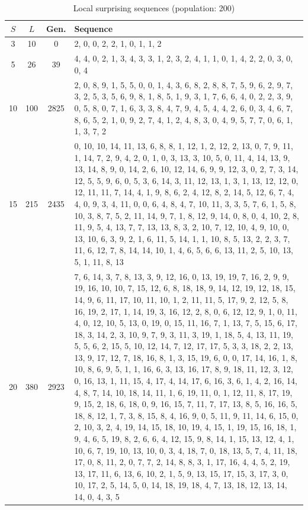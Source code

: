 \begin{table}
{\tiny
\begin{tabularx}{\textwidth}{cccX}
\toprule
$S$ & $L$ & Gen. & Sequence \\
\midrule
3   & 10  & 0   & 2, 0, 0, 2, 2, 1, 0, 1, 1, 2 \\
5   & 26  & 39  & 4, 4, 0, 2, 1, 3, 4, 3, 3, 1, 2, 3, 2, 4, 1, 1, 0, 1, 4, 2, 2, 0, 3, 0, 0, 4 \\
10  & 100 & 2825 & 2, 0, 8, 9, 1, 5, 5, 0, 0, 1, 4, 3, 6, 8, 2, 8, 8, 7, 5, 9, 6, 2, 9, 7, 3, 2, 5, 3, 5, 6, 9, 8, 1, 8, 5, 1, 9, 3, 1, 7, 6, 6, 4, 0, 2, 2, 3, 9, 0, 5, 8, 0, 7, 1, 6, 3, 3, 8, 4, 7, 9, 4, 5, 4, 4, 2, 6, 0, 3, 4, 6, 7, 8, 6, 5, 2, 1, 0, 9, 2, 7, 4, 1, 2, 4, 8, 3, 0, 4, 9, 5, 7, 7, 0, 6, 1, 1, 3, 7, 2 \\
15  & 215 & 2435 & 0, 10, 10, 14, 11, 13, 6, 8, 8, 1, 12, 1, 2, 12, 2, 13, 0, 7, 9, 11, 1, 14, 7, 2, 9, 4, 2, 0, 1, 0, 3, 13, 3, 10, 5, 0, 11, 4, 14, 13, 9, 13, 14, 8, 9, 0, 14, 2, 6, 10, 12, 14, 6, 9, 9, 12, 3, 0, 2, 7, 3, 14, 12, 5, 5, 9, 6, 0, 5, 3, 6, 14, 3, 11, 12, 13, 1, 3, 1, 13, 12, 12, 0, 12, 11, 11, 7, 14, 4, 1, 9, 8, 6, 2, 4, 12, 8, 2, 14, 5, 12, 6, 7, 4, 4, 0, 9, 3, 4, 11, 0, 0, 6, 4, 8, 4, 7, 10, 11, 3, 3, 5, 7, 6, 1, 5, 8, 10, 3, 8, 7, 5, 2, 11, 14, 9, 7, 1, 8, 12, 9, 14, 0, 8, 0, 4, 10, 2, 8, 11, 9, 5, 4, 13, 7, 7, 13, 13, 8, 3, 2, 10, 7, 12, 10, 4, 9, 10, 0, 13, 10, 6, 3, 9, 2, 1, 6, 11, 5, 14, 1, 1, 10, 8, 5, 13, 2, 2, 3, 7, 11, 6, 12, 7, 8, 14, 14, 10, 1, 4, 6, 5, 6, 6, 13, 11, 2, 5, 10, 13, 5, 1, 11, 8, 13 \\
20  & 380 & 2923 & 7, 6, 14, 3, 7, 8, 13, 3, 9, 12, 16, 0, 13, 19, 19, 7, 16, 2, 9, 9, 19, 16, 10, 10, 7, 15, 12, 6, 8, 18, 18, 9, 14, 12, 19, 12, 18, 15, 14, 9, 6, 11, 17, 10, 11, 10, 1, 2, 11, 11, 5, 17, 9, 2, 12, 5, 8, 16, 19, 2, 17, 1, 14, 19, 3, 16, 12, 2, 8, 0, 6, 12, 12, 9, 1, 0, 11, 4, 0, 12, 10, 5, 13, 0, 19, 0, 15, 11, 16, 7, 1, 13, 7, 5, 15, 6, 17, 18, 3, 14, 2, 3, 10, 9, 7, 9, 3, 11, 3, 19, 1, 18, 5, 4, 13, 11, 19, 5, 5, 6, 2, 15, 5, 10, 12, 14, 7, 12, 17, 17, 5, 3, 3, 18, 2, 2, 13, 13, 9, 17, 12, 7, 18, 16, 8, 1, 3, 15, 19, 6, 0, 0, 17, 14, 16, 1, 8, 10, 8, 6, 9, 5, 1, 1, 16, 6, 3, 13, 16, 17, 8, 9, 18, 11, 12, 3, 12, 0, 16, 13, 1, 11, 15, 4, 17, 4, 14, 17, 6, 16, 3, 6, 1, 4, 2, 16, 14, 4, 8, 7, 14, 10, 18, 14, 11, 1, 6, 19, 11, 0, 1, 12, 11, 8, 17, 19, 9, 15, 2, 18, 6, 18, 0, 9, 16, 15, 7, 11, 7, 17, 13, 8, 5, 16, 16, 5, 18, 8, 12, 1, 7, 3, 8, 15, 8, 4, 16, 9, 0, 5, 11, 9, 11, 14, 6, 15, 0, 2, 10, 3, 2, 4, 19, 14, 15, 18, 10, 19, 4, 15, 1, 19, 15, 16, 18, 1, 9, 4, 6, 5, 19, 8, 2, 6, 6, 4, 12, 15, 9, 8, 14, 1, 15, 13, 12, 4, 1, 10, 6, 7, 19, 10, 13, 10, 0, 3, 4, 18, 7, 0, 18, 13, 5, 7, 4, 11, 18, 17, 0, 8, 11, 2, 0, 7, 7, 2, 14, 8, 8, 3, 1, 17, 16, 4, 4, 5, 2, 19, 13, 17, 11, 6, 13, 6, 10, 2, 1, 5, 9, 13, 15, 17, 15, 3, 17, 3, 0, 10, 17, 2, 5, 14, 5, 0, 14, 18, 19, 18, 4, 7, 13, 18, 12, 13, 14, 14, 0, 4, 3, 5 \\
\bottomrule
\end{tabularx}
}
\caption{Local surprising sequences (population: 200)}
\label{table:local_surprising}
\end{table}

